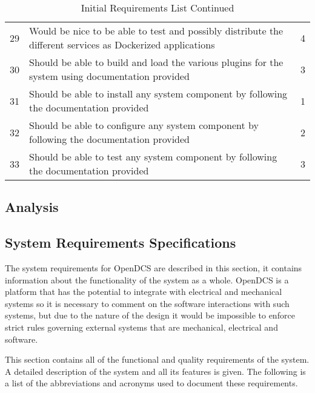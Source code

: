 \begin{table}[H]
\begin{tabular}{l p{11cm} p{3cm}}
        29 & Would be nice to be able to test and possibly distribute the different services as Dockerized applications & 4 \\
        30 & Should be able to build and load the various plugins for the system using documentation provided & 3 \\
        31 & Should be able to install any system component by following the documentation provided & 1 \\
        32 & Should be able to configure any system component by following the documentation provided & 2 \\
        33 & Should be able to test any system component by following the documentation provided & 3 \\
        \bottomrule
      \end{tabular}
      \caption{Initial Requirements List Continued}\label{tab:requirements-cont}
    \end{table}

  \subsection{Analysis}\label{sec:req-analyze}

  \subsection{System Requirements Specifications}\label{sec:req-srs}

    The system requirements for OpenDCS are described in this section, it
    contains information about the functionality of the system as a whole.
    OpenDCS is a platform that has the potential to integrate with electrical
    and mechanical systems so it is necessary to comment on the software
    interactions with such systems, but due to the nature of the design it
    would be impossible to enforce strict rules governing external systems
    that are mechanical, electrical and software.

    This section contains all of the functional and quality requirements of
    the system. A detailed description of the system and all its features is
    given. The following is a list of the abbreviations and acronyms used to
    document these requirements.

